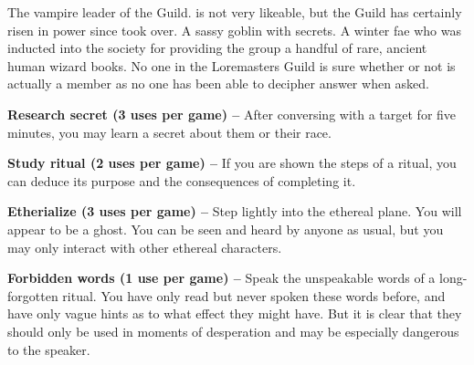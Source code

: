 \documentclass[blue]{guildcamp2}
\begin{document}
\begin{members}
  \member{\cVampire{}} The vampire leader of the Guild. \cVampire{\They} is not very likeable, but the Guild has certainly risen in power since \cVampire{\they} took over.
	\member{\cGoblin{}} A sassy goblin with secrets. 
	\member{\cBabyFae{}} A winter fae who was inducted into the society for providing the group a handful of rare, ancient human wizard books.
	\member{\cSphinx{}} No one in the Loremasters Guild is sure whether or not \cSphinx{} is actually a member as no one has been able to decipher \cSphinx{\their} answer when asked.
	
\end{members}


\begin{itemz}
	\item \textbf{Research secret (3 uses per game) --} After conversing with a target for five minutes, you may learn a secret about them or their race.
	\item \textbf{Study ritual (2 uses per game) --} If you are shown the steps of a ritual, you can deduce its purpose and the consequences of completing it.
	\item \textbf{Etherialize (3 uses per game) --} Step lightly into the ethereal plane. You will appear to be a ghost. You can be seen and heard by anyone as usual, but you may only interact with other ethereal characters.
	\item \textbf{Forbidden words (1 use per game) --} Speak the unspeakable words of a long-forgotten ritual. You have only read but never spoken these words before, and have only vague hints as to what effect they might have. But it is clear that they should only be used in moments of desperation and may be especially dangerous to the speaker.
\end{itemz}
	
\end{document}
